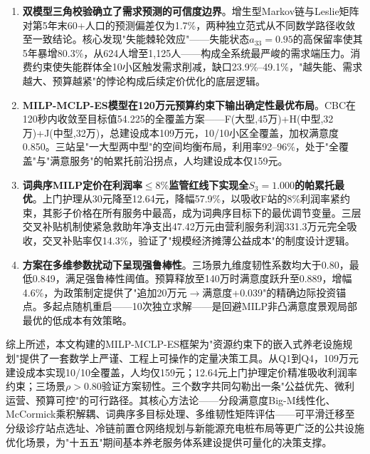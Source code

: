 \documentclass[12pt,a4paper]{ctexart}
\begin{document}
\begin{enumerate}[label=\textbf{(\arabic*)}, leftmargin=*]

    \item \textbf{双模型三角校验确立了需求预测的可信度边界}。增生型Markov链与Leslie矩阵对第5年末60+人口的预测偏差仅为1.7\%，两种独立范式从不同数学路径收敛至一致结论。核心发现"失能棘轮效应"——失能状态$a_{33}=0.95$的高保留率使其5年暴增80.3\%，从624人增至1,125人——构成全系统最严峻的需求端压力。消费约束使失能群体全10小区触发需求削减，缺口23.9\%--49.1\%，"越失能、需求越大、预算越紧"的悖论构成后续定价优化的底层逻辑。

    \item \textbf{MILP-MCLP-ES模型在120万元预算约束下输出确定性最优布局}。CBC在120秒内收敛至目标值54.225的全覆盖方案——F(大型,45万)+H(中型,32万)+J(中型,32万)，总建设成本109万元，10/10小区全覆盖，加权满意度0.850。三站呈"一大型两中型"的空间均衡布局，利用率92--96\%，处于"全覆盖"与"满意服务"的帕累托前沿拐点，人均建设成本仅159元。

    \item \textbf{词典序MILP定价在利润率$\le 8\%$监管红线下实现全$S_3=1.000$的帕累托最优}。上门护理从30元降至12.64元，降幅57.9\%，以吸收F站的8\%利润率紧约束，其影子价格在所有服务中最高，成为词典序目标下的最优调节变量。三层交叉补贴机制使紧急救助年净支出47.42万元由营利服务利润331.3万元完全吸收，交叉补贴率仅14.3\%，验证了"规模经济摊薄公益成本"的制度设计逻辑。

    \item \textbf{方案在多维参数扰动下呈现强鲁棒性}。三场景九维度韧性系数均大于0.80，最低0.849，满足强鲁棒性阈值。预算释放至140万时满意度跃升至0.889，增幅4.6\%，为政策制定提供了"追加20万元$\to$满意度+0.039"的精确边际投资锚点。多起点随机重启——10次独立求解——是回避MILP非凸满意度景观局部最优的低成本有效策略。

\end{enumerate}

综上所述，本文构建的MILP-MCLP-ES框架为"资源约束下的嵌入式养老设施规划"提供了一套数学上严谨、工程上可操作的定量决策工具。从Q1到Q4，109万元建设成本实现10/10全覆盖，人均仅159元；12.64元上门护理定价精准吸收利润率约束；三场景$\rho>0.80$验证方案韧性。三个数字共同勾勒出一条"公益优先、微利运营、预算可控"的可行路径。其核心方法论——分段满意度Big-M线性化、McCormick乘积解耦、词典序多目标处理、多维韧性矩阵评估——可平滑迁移至分级诊疗站点选址、冷链前置仓网络规划与新能源充电桩布局等更广泛的公共设施优化场景，为"十五五"期间基本养老服务体系建设提供可量化的决策支撑。
\end{document}
